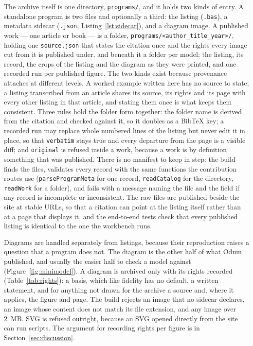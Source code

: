 The archive itself is one directory, \texttt{programs/}, and it holds two kinds of entry. A standalone program is two files and optionally a third: the listing (\texttt{.bas}), a metadata sidecar (\texttt{.json}, Listing~\ref{lst:sidecar}), and a diagram image. A published work --- one article or book --- is a folder, \texttt{programs/<author\_title\_year>/}, holding one \texttt{source.json} that states the citation once and the rights every image cut from it is published under, and beneath it a folder per model: the listing, its record, the crops of the listing and the diagram as they were printed, and one recorded run per published figure. The two kinds exist because provenance attaches at different levels. A worked example written here has no source to state; a listing transcribed from an article shares its source, its rights and its page with every other listing in that article, and stating them once is what keeps them consistent. Three rules hold the folder form together: the folder name is derived from the citation and checked against it, so it doubles as a BibTeX key; a recorded run may replace whole numbered lines of the listing but never edit it in place, so that \texttt{verbatim} stays true and every departure from the page is a visible diff; and \texttt{original} is refused inside a work, because a work is by definition something that was published. There is no manifest to keep in step: the build finds the files, validates every record with the same functions the contribution routes use (\texttt{parseProgramMeta} for one record, \texttt{readCatalog} for the directory, \texttt{readWork} for a folder), and fails with a message naming the file and the field if any record is incomplete or inconsistent. The raw files are published beside the site at stable URLs, so that a citation can point at the listing itself rather than at a page that displays it, and the end-to-end tests check that every published listing is identical to the one the workbench runs.

Diagrams are handled separately from listings, because their reproduction raises a question that a program does not. The diagram is the other half of what Odum published, and usually the easier half to check a model against (Figure~\ref{fig:minimodel}). A diagram is archived only with its rights recorded (Table~\ref{tab:rights}): a basis, which like fidelity has no default, a written statement, and for anything not drawn for the archive a source and, where it applies, the figure and page. The build rejects an image that no sidecar declares, an image whose content does not match its file extension, and any image over 2~MB. SVG is refused outright, because an SVG opened directly from the site can run scripts. The argument for recording rights per figure is in Section~\ref{sec:discussion}.

